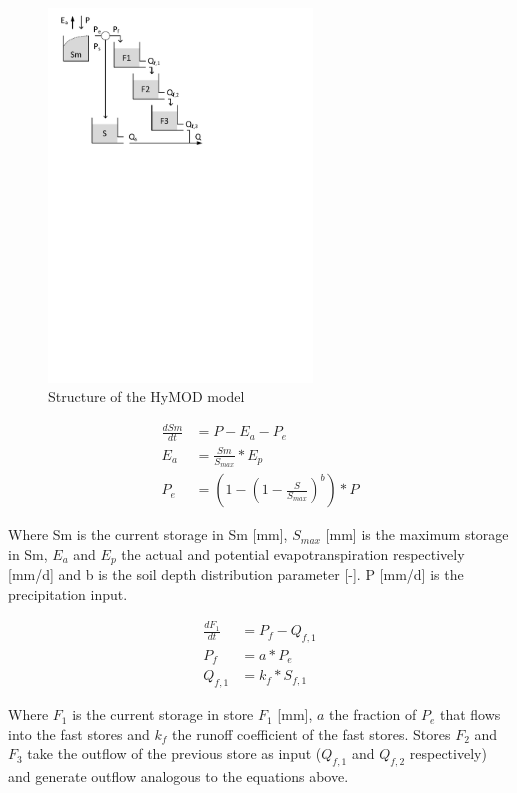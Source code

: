 { 																	%
\begin{figure}
\includegraphics[trim=1cm 18.5cm 7cm 1cm,width=7cm,keepaspectratio]{./files/29_schematic.pdf}
\caption{Structure of the HyMOD model} \label{fig:29_schematic}
\end{figure}

\begin{align}
	\frac{dSm}{dt} &= P-E_a-P_e \\
	E_a &= \frac{Sm}{S_{max}}*E_p\\
	P_e &= \left(1-\left(1-\frac{S}{S_{max}}\right)^b\right)*P
\end{align}

Where Sm is the current storage in Sm [mm], $S_{max}$ [mm] is the maximum storage in Sm, $E_a$ and $E_p$ the actual and potential evapotranspiration respectively [mm/d] and b is the soil depth distribution parameter [-]. P [mm/d] is the precipitation input.

\begin{align}
	\frac{dF_1}{dt} &= P_f - Q_{f,1}\\
	P_f &= a*P_e \\
	Q_{f,1} &= k_f*S_{f,1} 
\end{align}

} %

\noindent Where $F_1$ is the current storage in store $F_1$ [mm], $a$ the fraction of $P_e$ that flows into the fast stores and $k_f$ the runoff coefficient of the fast stores. Stores $F_2$ and $F_3$ take the outflow of the previous store as input ($Q_{f,1}$ and $Q_{f,2}$ respectively) and generate outflow analogous to the equations above.

